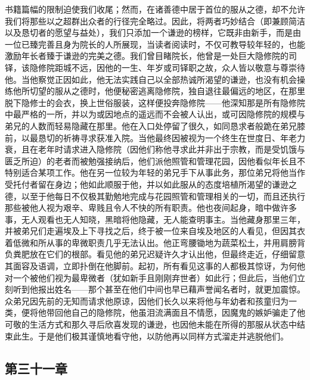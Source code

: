 书籍篇幅的限制迫使我们收尾；然而，在诸善德中居于首位的服从之德，却不允许我们将那些以之超群出众者的行径完全略过。因此，将两者巧妙结合（即兼顾简洁以及恳切者的愿望与益处），我们只添加一个谦逊的榜样，它既非由新手，而是由一位已臻完善且身为院长的人所展现，当读者阅读时，不仅可教导较年轻的，也能激励年长者臻于谦逊的完美之德。我们曾目睹院长，他曾是一处巨大隐修院的司铎，该隐修院距城不远，因他的一生、年岁或司铎职之故，众人皆以敬意与尊崇待他。当他察觉正因如此，他无法实践自己以全部热诚所渴望的谦逊，也没有机会操练他所切望的服从之德时，他便秘密逃离隐修院，独自退往最偏远的地区，在那里脱下隐修士的会衣，换上世俗服装，这样便投奔隐修院——他深知那是所有隐修院中最严格的一所，并以为或因地点的遥远而不会被人认出，或可因隐修院的规模与弟兄的人数而轻易隐藏在那里。他在入口处停留了很久，如同恳求者般跪在弟兄膝前，以最恳切的祈祷寻求获准入院。当他最终因被视为一个终生在世度日、年老力衰，且在老年时请求进入隐修院（因他们称他寻求此并非出于宗教，而是受饥饿与匮乏所迫）的老者而被勉强接纳后，他们派他照管和管理花园，因他看似年长且不特别适合某项工作。他在另一位较为年轻的弟兄手下从事此务，那位弟兄将他当作受托付者留在身边；他如此顺服于他，并以如此服从的态度培植所渴望的谦逊之德，以至于他每日不仅极其勤勉地完成与花园照管和管理相关的一切，而且还执行那些被他人视为艰辛、卑贱且令人不快的所有职责。他也夜间起身，暗中做许多事，无人观看也无人知晓，黑暗将他隐藏，无人能查明事主。当他藏身那里三年，并被弟兄们走遍埃及上下寻找之后，终于被一位来自埃及地区的人看见，但因其衣着低微和所从事的卑微职责几乎无法认出。他正弯腰锄地为蔬菜松土，并用肩膀背负粪肥放在它们的根部。看见他的弟兄迟疑许久才认出他，但最终走近，仔细留意其面容及语调，立即扑倒在他脚前。起初，所有看见这事的人都极其惊讶，为何他对一个被他们视为最卑微者（犹如新手且刚刚弃世者）如此行；但此后，当他们立刻听到他报出姓名——那个甚至在他们中间也早已藉声誉闻名者时，就更加震惊。众弟兄因先前的无知而请求他原谅，因他们长久以来将他与年幼者和孩童归为一类，便将他带回他自己的隐修院，他虽泪流满面且不情愿，因魔鬼的嫉妒骗走了他可敬的生活方式和那久寻后欣喜发现的谦逊，也因他未能在所得的那服从状态中结束此生。于是他们极其谨慎地看守他，以防他再以同样方式溜走并逃脱他们。\par


\subsection{第三十一章}

\par

